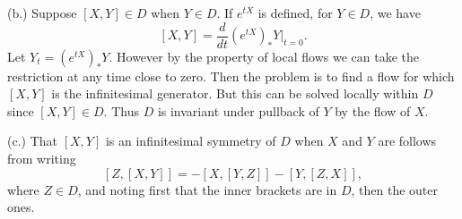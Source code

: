 \documentclass[11pt, reqno]{article}
\theoremstyle{plain}
\theoremstyle{definition}
\theoremstyle{remark}
\begin{document}
\begin{enumerate}
    (b.) Suppose $[X, Y] \in D$ when $Y \in D$. If $e^{tX}$ is defined, for $Y \in D$, we have 
    \[
        [X,Y] = \frac{d}{dt}(e^{tX})_* Y|_{t = 0}.
    \]
    Let $Y_t = (e^{tX})_* Y$. However by the property of local flows we can take the restriction at any time close
    to zero. Then the problem is to find a flow for which $[X,Y]$ is the infinitesimal generator. But 
    this can be solved locally within $D$ since $[X,Y] \in D$. Thus $D$ is invariant under pullback of $Y$ 
    by the flow of $X$.

    (c.) That $[X,Y]$ is an infinitesimal symmetry of $D$ when $X$ and $Y$ are follows from writing 
    \[
        [Z,[X,Y]] = -[X, [Y,Z]] - [Y, [Z,X]],
    \]
    where $Z \in D$, and noting first that the inner brackets are in $D$, then the outer ones.


\end{enumerate}
\end{document}
